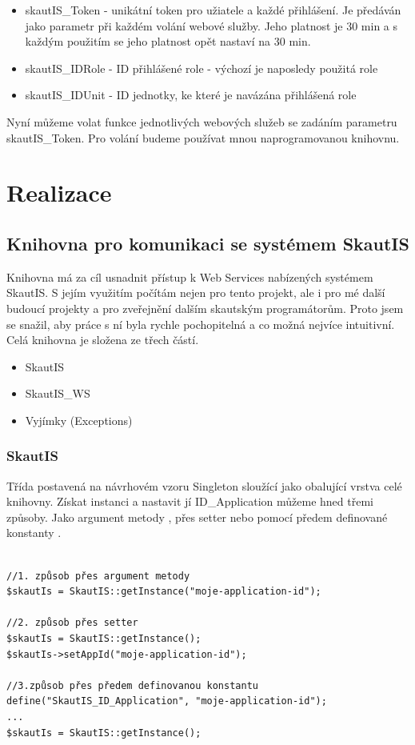 \documentclass[thesis=B,czech]{FITthesis}[2011/06/14]
\begin{document}
\begin{itemize}
	\item skautIS\_Token - unikátní token pro užiatele a každé přihlášení. Je předáván jako parametr při každém volání webové služby. Jeho platnost je 30 min a s každým použitím se jeho platnost opět nastaví na 30 min. 
	\item skautIS\_IDRole - ID přihlášené role - výchozí je naposledy použitá role 
	\item skautIS\_IDUnit - ID jednotky, ke které je navázána přihlášená role 
\end{itemize}

Nyní můžeme volat funkce jednotlivých webových služeb se zadáním parametru skautIS\_Token. Pro volání budeme používat mnou naprogramovanou knihovnu. 

\chapter{Realizace}

\section{Knihovna pro komunikaci se systémem SkautIS}
Knihovna má za cíl usnadnit přístup k Web Services nabízených systémem SkautIS. S jejím využitím počítám nejen pro tento projekt, ale i pro mé další budoucí projekty a pro zveřejnění dalším skautským programátorům. Proto jsem se snažil, aby práce s ní byla rychle pochopitelná a co možná nejvíce intuitivní.
Celá knihovna je složena ze třech částí.
\begin{itemize}
	\item SkautIS
	\item SkautIS\_WS
	\item Vyjímky (Exceptions)
\end{itemize}

\subsection{SkautIS}
Třída postavená na návrhovém vzoru Singleton sloužící jako obalující vrstva celé knihovny. Získat instanci a nastavit jí ID\_Application můžeme hned třemi způsoby. Jako argument metody , přes setter  nebo pomocí předem definované konstanty .  

\begin{verbatim}

//1. způsob přes argument metody
$skautIs = SkautIS::getInstance("moje-application-id");

//2. způsob přes setter
$skautIs = SkautIS::getInstance();
$skautIs->setAppId("moje-application-id"); 

//3.způsob přes předem definovanou konstantu
define("SkautIS_ID_Application", "moje-application-id"); 
...
$skautIs = SkautIS::getInstance(); 
\end{verbatim}
\end{document}
